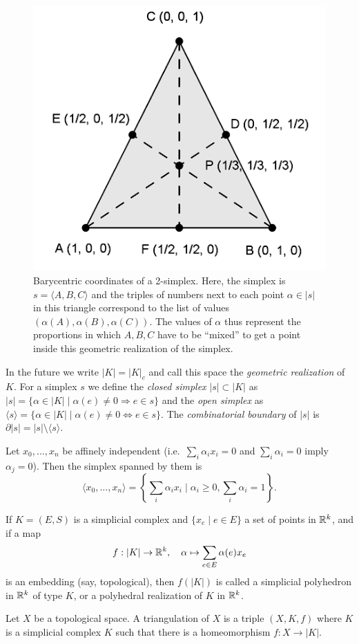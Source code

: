 \begin{figure}[tp]
    \centering
    \includegraphics[scale=0.3]{figures/barycentric.png}
    \caption{Barycentric coordinates of a 2-simplex. Here, the simplex is $s=\langle A,B,C\rangle$ and the triples of numbers next to each point $\alpha\in |s|$ in this triangle correspond to the list of values $(\alpha(A),\alpha(B),\alpha(C))$. The values of $\alpha$ thus represent the proportions in which $A,B,C$ have to be ``mixed'' to get a point inside this geometric realization of the simplex.\label{fig. simplex}}
\end{figure}


In the future we write $|K|=|K|_c$ and call this space the \emph{geometric realization} of $K$. For a simplex $s$ we define the \emph{closed simplex} $|s|\subset |K|$ as $|s|=\{\alpha\in|K|\mid \alpha(e)\neq 0\Rightarrow e\in s\}$ and the \emph{open simplex} as $\langle s\rangle=\{\alpha\in |K|\mid \alpha(e)\neq 0\Leftrightarrow e\in s\}$. The \emph{combinatorial boundary} of $|s|$ is $\partial|s|=|s|\setminus\langle s\rangle$.

\begin{defn}
    Let $x_0,\ldots,x_n$ be affinely independent (i.e.\ $\sum_i\alpha_i x_i=0$ and $\sum_i\alpha_i=0$ imply $\alpha_j=0$). Then the simplex spanned by them is \[\langle x_0,\ldots,x_n\rangle=\left\{\sum_i \alpha_i x_i\mid \alpha_i\geq 0,\sum_i \alpha_i=1\right\}.\]
\end{defn}
\begin{defn}
    If $K=(E,S)$ is a simplicial complex and $\{x_e\mid e\in E\}$ a set of points in $\mathbb{R}^k$, and if a map
    \[f:|K|\to \mathbb{R}^k,\quad \alpha\mapsto \sum_{e\in E}\alpha(e)x_e\]
    is an embedding (say, topological), then $f(|K|)$ is called a simplicial polyhedron in $\mathbb{R}^k$ of type $K$, or a polyhedral realization of $K$ in $\mathbb{R}^k$.
\end{defn}
\begin{defn}[Triangulation]
    Let $X$ be a topological space. A triangulation of $X$ is a triple $(X,K,f)$ where $K$ is a simplicial complex $K$ such that there is a homeomorphism $f:X\to |K|$.
\end{defn}

